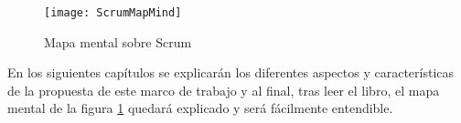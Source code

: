 \begin{figure}[h]
  \centering
  \texttt{[image: ScrumMapMind]}
  \caption{Mapa mental sobre Scrum}
  \centering
  \label{fig:ScrumMapMind} %
\end{figure}

En los siguientes capítulos se explicarán los diferentes aspectos y características de la propuesta de este marco de trabajo y al final, tras leer el libro, el mapa mental de la figura \ref{fig:ScrumMapMind} quedará explicado y será fácilmente entendible. 
